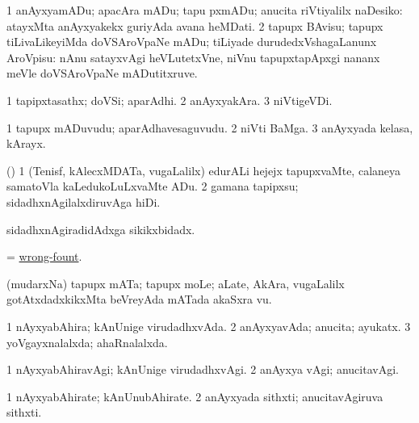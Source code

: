 \bentry
{} 
\gl{\sakirx}
\expl{}
\bmng
\bnum
\num{1} anAyxyamADu; apacAra mADu; tapu pxmADu; anucita riVtiyalilx naDesiko:  atayxMta anAyxyakekx guriyAda avana heMDati. 
\num{2} tapupx BAvisu; tapupx tiLivaLikeyiMda doVSAroVpaNe mADu; tiLiyade durudedxVshagaLanunx AroVpisu:  nAnu satayxvAgi heVLutetxVne, niVnu tapupxtapApxgi nananx meVle doVSAroVpaNe mADutitxruve. 
\enum
\emng
\eentry

\bentry
{} 
\gl{\nA}
\expl{}
\bmng
\bnum
\num{1} tapipxtasathx; doVSi; aparAdhi. 
\num{2} anAyxyakAra. 
\num{3} niVtigeVDi. 
\enum
\emng
\eentry

\bentry
{} 
\gl{\nA}
\expl{}
\bmng
\bnum
\num{1} tapupx mADuvudu; aparAdhavesaguvudu. 
\num{2} niVti BaMga. 
\num{3} anAyxyada kelasa, kArayx. 
\enum
\emng
\eentry

\bentry
{} 
\gl{\sakirx}
\expl{}
\bmng
(\AmA) 
\bnum
\num{1} (Tenisf, kAlecxMDATa, \mo vugaLalilx) edurALi hejejx tapupxvaMte, calaneya samatoVla kaLedukoLuLxvaMte ADu. 
\num{2} gamana tapipxsu; sidadhxnAgilalxdiruvAga hiDi. 
\enum
\emng
\eentry

\bentry
{} 
\gl{\gu}
\expl{}
\bmng
sidadhxnAgiradidAdxga sikikxbidadx. 
\emng
\eentry

\bentry
{} 
\gl{\nA}
\expl{}
\bmng
= \hyperlink{wrong-fount}{wrong-fount}. 
\emng
\eentry

\bentry
{} 
\gl{\nA}
\expl{}
\bmng
(mudarxNa) tapupx mATa; tapupx moLe; aLate, AkAra, \mo vugaLalilx gotAtxdadxkikxMta beVreyAda mATada akaSxra \mo vu. 
\emng
\eentry

\bentry
{} 
\gl{\gu}
\expl{}
\bmng
\bnum
\num{1} nAyxyabAhira; kAnUnige virudadhxvAda. 
\num{2} anAyxyavAda; anucita; ayukatx. 
\num{3} yoVgayxnalalxda; ahaRnalalxda. 
\enum
\emng
\eentry

\bentry
{} 
\gl{\kirxvi}
\expl{}
\bmng
\bnum
\num{1} nAyxyabAhiravAgi; kAnUnige virudadhxvAgi. 
\num{2} anAyxya vAgi; anucitavAgi. 
\enum
\emng
\eentry

\bentry
{} 
\gl{\nA}
\expl{}
\bmng
\bnum
\num{1} nAyxyabAhirate; kAnUnubAhirate. 
\num{2} anAyxyada sithxti; anucitavAgiruva sithxti. 
\enum
\emng
\eentry

